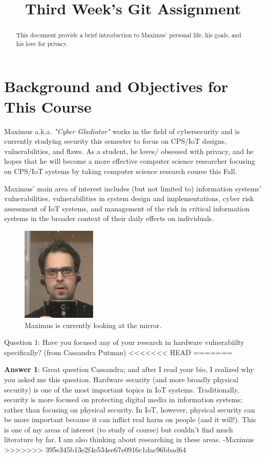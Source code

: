 


 \title{Third Week's Git Assignment} 

 \maketitle


\begin{abstract}
This document provide a brief introduction to Maximus' personal life, his goals, and his love for privacy.
\end{abstract}
\section{Background and Objectives for This Course}
Maximus a.k.a. \emph{"Cyber Gladiator"} works in the field of cybersecurity and is currently studying security this semester to focus on CPS/IoT designs, vulnerabilities, and flaws. As a student, he loves/ obsessed with privacy, and he hopes that he will become a more effective computer science researcher focusing on CPS/IoT systems by taking computer science research course this Fall.

Maximus' main area of interest includes (but not limited to) information systems’ vulnerabilities, vulnerabilities in system design and implementations, cyber risk assessment of IoT systems, and management of the risk in critical information systems in the broader context of their daily effects on individuals.


\begin{figure}[htbp]
\centerline{\includegraphics{a481.jpg}}
\caption{Maximus is currently looking at the mirror.}
\label{fig}
\end{figure}

Question 1: Have you focused any of your research in hardware vulnerabiilty specifically?  (from Cassandra Putman)  
<<<<<<< HEAD
=======

\textbf{Answer 1}: Great question Cassandra; and after I read your bio, I realized why you asked me this question.  Hardware security (and more broadly physical security) is one of the most important topics in IoT systems. Traditionally, security is more focused on protecting digital media in information systems; rather than focusing on physical security. In IoT, however, physical security can be more important because it can inflict real harm on people (and it will!). This is one of my areas of interest (to study of course) but couldn't find much literature by far. I am also thinking about researching in these areas. -Maximus
>>>>>>> 395e345b13e2f4e534ee67e0916c1dac96bbad64

